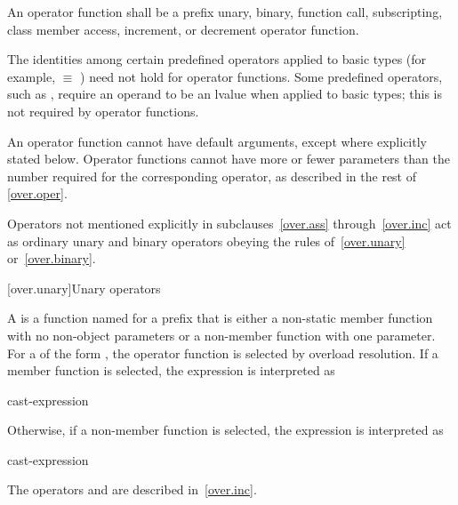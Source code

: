 \pnum
An operator function shall be a
prefix unary, binary, function call, subscripting, class member access, increment, or decrement
operator function.

\pnum
{}%
\begin{note}
The identities among certain predefined operators applied to basic types
(for example,
 $\equiv$
)
need not hold for operator functions.
Some predefined operators, such as
\tcode{+=},
require an operand to be an lvalue when applied to basic types;
this is not required by operator functions.
\end{note}

\pnum
{}%
An operator function cannot have default arguments,
except where explicitly stated below.
Operator
functions cannot have more or fewer parameters than the
number required for the corresponding operator, as
described in the rest of \ref{over.oper}.

\pnum
Operators not mentioned explicitly in subclauses~\ref{over.ass} through~\ref{over.inc}
act as ordinary unary and binary
operators obeying the rules of~\ref{over.unary} or~\ref{over.binary}.%
%

[over.unary]{Unary operators}%
%

\pnum
A 
is a function named 
for a prefix  
that is either
a non-static member function with no non-object parameters or
a non-member function with one parameter.
%
For a 
of the form ,
the operator function is selected by overload resolution.
If a member function is selected,
the expression is interpreted as
\begin{ncsimplebnf}
cast-expression    \terminal{(}\terminal{)}
\end{ncsimplebnf}
Otherwise, if a non-member function is selected,
the expression is interpreted as
\begin{ncsimplebnf}
  \terminal{(} cast-expression \terminal{)}
\end{ncsimplebnf}
\begin{note}
The operators \tcode{++} and \tcode{--}
are described in~\ref{over.inc}.
\end{note}


